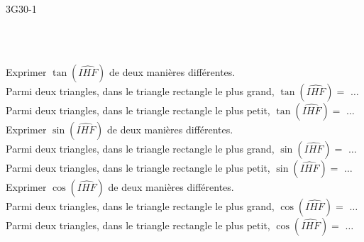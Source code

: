 \documentclass[11pt]{article}
\begin{document}
\begin{exercice}{}{3G30-1}
\begin{enumerate}[itemsep=2em]
\begin{minipage}[t]{\linewidth}
\begin{minipage}{.4\linewidth}
\begin{tikzpicture}[baseline,scale = 0.5]
\end{tikzpicture}\\\\
\end{minipage}
\begin{minipage}{.6\linewidth}
Exprimer $\tan(\widehat{IHF})$ de deux manières différentes.\\Parmi deux triangles, dans le triangle rectangle le plus grand, $\tan\left(\widehat{IHF}\right)=$ $\ldots$\\Parmi deux triangles, dans le triangle rectangle le plus petit, $\tan\left(\widehat{IHF}\right)=$ $\ldots$\\Exprimer $\sin(\widehat{IHF})$ de deux manières différentes.\\Parmi deux triangles, dans le triangle rectangle le plus grand, $\sin\left(\widehat{IHF}\right)=$ $\ldots$\\Parmi deux triangles, dans le triangle rectangle le plus petit, $\sin\left(\widehat{IHF}\right)=$ $\ldots$\\Exprimer $\cos(\widehat{IHF})$ de deux manières différentes.\\Parmi deux triangles, dans le triangle rectangle le plus grand, $\cos\left(\widehat{IHF}\right)=$ $\ldots$\\Parmi deux triangles, dans le triangle rectangle le plus petit, $\cos\left(\widehat{IHF}\right)=$ $\ldots$\\
\end{minipage}
 \end{minipage}
\end{enumerate}

\end{exercice}
\end{document}
